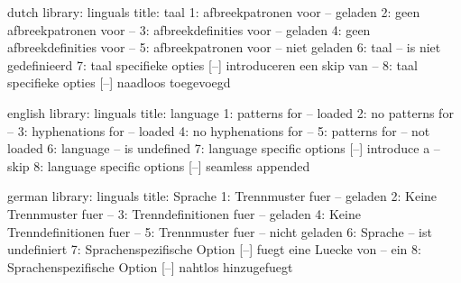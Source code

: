 


\unprotect

\startmessages  dutch  library: linguals
  title: taal
      1: afbreekpatronen voor -- geladen
      2: geen afbreekpatronen voor --
      3: afbreekdefinities voor -- geladen
      4: geen afbreekdefinities voor --
      5: afbreekpatronen voor -- niet geladen
      6: taal -- is niet gedefinieerd
      7: taal specifieke opties [--] introduceren een skip van --
      8: taal specifieke opties [--] naadloos toegevoegd
\stopmessages

\startmessages  english  library: linguals
  title: language
      1: patterns for -- loaded
      2: no patterns for --
      3: hyphenations for -- loaded
      4: no hyphenations for --
      5: patterns for -- not loaded
      6: language -- is undefined
      7: language specific options [--] introduce a -- skip
      8: language specific options [--] seamless appended
\stopmessages

\startmessages  german  library: linguals
  title: Sprache
      1: Trennmuster fuer -- geladen
      2: Keine Trennmuster fuer --
      3: Trenndefinitionen fuer -- geladen
      4: Keine Trenndefinitionen fuer --
      5: Trennmuster fuer -- nicht geladen
      6: Sprache -- ist undefiniert
      7: Sprachenspezifische Option [--] fuegt eine Luecke von -- ein
      8: Sprachenspezifische Option [--] nahtlos hinzugefuegt
\stopmessages



